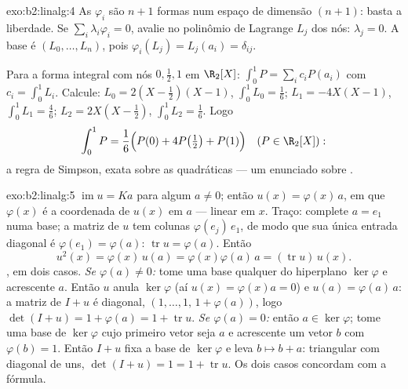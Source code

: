 \begin{solution}{exo:b2:linalg:4}
As $\varphi_i$ são $n + 1$ formas num espaço de dimensão $(n+1)$:
basta a liberdade. Se $\sum_i \lambda_i \varphi_i = 0$, avalie no
polinômio de Lagrange $L_j$ dos nós: $\lambda_j = 0$. A
base  é $(L_0, \dots, L_n)$, pois $\varphi_i(L_j) =
L_j(a_i) = \delta_{ij}$.

Para a forma integral com nós $0, \frac12, 1$ em $\R_2[X]$:
$\int_0^1 P = \sum_i c_i P(a_i)$ com $c_i = \int_0^1 L_i$. Calcule:
$L_0 = 2(X - \tfrac12)(X - 1)$, $\int_0^1 L_0 = \frac16$; $L_1 =
-4X(X-1)$, $\int_0^1 L_1 = \frac46$; $L_2 = 2X(X - \tfrac12)$,
$\int_0^1 L_2 = \frac16$. Logo
\[
\int_0^1 P = \frac{1}{6}\Bigl(P(0) + 4P\bigl(\tfrac12\bigr) +
P(1)\Bigr)
\quad (P \in \R_2[X]) :
\]
a regra de Simpson, exata sobre as quadráticas --- um enunciado sobre .
\end{solution}

\begin{solution}{exo:b2:linalg:5}
$\operatorname{im} u = Ka$ para algum $a \neq 0$; então $u(x) =
\varphi(x)\,a$, em que $\varphi(x)$ é a coordenada de $u(x)$ em $a$
--- linear em $x$. Traço: complete $a = e_1$ numa base; a
matriz de $u$ tem colunas $\varphi(e_j)\,e_1$, de modo que sua única
entrada diagonal é $\varphi(e_1) = \varphi(a)$: $\operatorname{tr} u =
\varphi(a)$. Então
\[
u^2(x) = \varphi(x)\, u(a) = \varphi(x)\varphi(a)\, a
= (\operatorname{tr} u)\, u(x).
\]
, em dois casos. \emph{Se $\varphi(a) \neq 0$:} tome uma
base qualquer do hiperplano $\ker\varphi$ e acrescente $a$. Então $u$ anula
$\ker\varphi$ (aí $u(x) = \varphi(x)a = 0$) e $u(a) =
\varphi(a)\,a$: a matriz de $I + u$ é diagonal, $(1, \dots, 1,\,
1 + \varphi(a))$, logo $\det(I + u) = 1 + \varphi(a) = 1 +
\operatorname{tr} u$. \emph{Se $\varphi(a) = 0$:} então $a \in
\ker\varphi$; tome uma base de $\ker\varphi$ cujo primeiro vetor seja
$a$ e acrescente um vetor $b$ com $\varphi(b) = 1$. Então $I + u$
fixa a base de $\ker\varphi$ e leva $b \mapsto b + a$:
triangular com diagonal de uns, $\det(I + u) = 1 = 1 +
\operatorname{tr} u$. Os dois casos concordam com a fórmula.
\end{solution}

